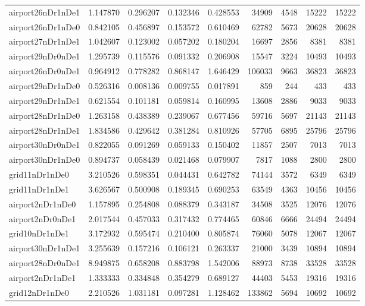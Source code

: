 \begin{longtable}{|l|r|r|r|r|r|r|r|r|}
airport26nDr1nDe1 & 1.147870 & 0.296207 & 0.132346 & 0.428553 & 34909 & 4548 & 15222 & 15222 \\
airport26nDr1nDe0 & 0.842105 & 0.456897 & 0.153572 & 0.610469 & 62782 & 5673 & 20628 & 20628 \\
airport27nDr1nDe1 & 1.042607 & 0.123002 & 0.057202 & 0.180204 & 16697 & 2856 & 8381 & 8381 \\
airport29nDr0nDe1 & 1.295739 & 0.115576 & 0.091332 & 0.206908 & 15547 & 3224 & 10493 & 10493 \\
airport26nDr0nDe1 & 0.964912 & 0.778282 & 0.868147 & 1.646429 & 106033 & 9663 & 36823 & 36823 \\
airport29nDr1nDe0 & 0.526316 & 0.008136 & 0.009755 & 0.017891 & 859 & 244 & 433 & 433 \\
airport29nDr1nDe1 & 0.621554 & 0.101181 & 0.059814 & 0.160995 & 13608 & 2886 & 9033 & 9033 \\
airport28nDr1nDe0 & 1.263158 & 0.438389 & 0.239067 & 0.677456 & 59716 & 5697 & 21143 & 21143 \\
airport28nDr1nDe1 & 1.834586 & 0.429642 & 0.381284 & 0.810926 & 57705 & 6895 & 25796 & 25796 \\
airport30nDr0nDe1 & 0.822055 & 0.091269 & 0.059133 & 0.150402 & 11857 & 2507 & 7013 & 7013 \\
airport30nDr1nDe0 & 0.894737 & 0.058439 & 0.021468 & 0.079907 & 7817 & 1088 & 2800 & 2800 \\
grid11nDr1nDe0 & 3.210526 & 0.598351 & 0.044431 & 0.642782 & 74144 & 3572 & 6349 & 6349 \\
grid11nDr1nDe1 & 3.626567 & 0.500908 & 0.189345 & 0.690253 & 63549 & 4363 & 10456 & 10456 \\
airport2nDr1nDe0 & 1.157895 & 0.254808 & 0.088379 & 0.343187 & 34508 & 3525 & 12076 & 12076 \\
airport2nDr0nDe1 & 2.017544 & 0.457033 & 0.317432 & 0.774465 & 60846 & 6666 & 24494 & 24494 \\
grid10nDr1nDe1 & 3.172932 & 0.595474 & 0.210400 & 0.805874 & 76060 & 5078 & 12067 & 12067 \\
airport30nDr1nDe1 & 3.255639 & 0.157216 & 0.106121 & 0.263337 & 21000 & 3439 & 10894 & 10894 \\
airport28nDr0nDe1 & 8.949875 & 0.658208 & 0.883798 & 1.542006 & 88973 & 8738 & 33528 & 33528 \\
airport2nDr1nDe1 & 1.333333 & 0.334848 & 0.354279 & 0.689127 & 44403 & 5453 & 19316 & 19316 \\
grid12nDr1nDe0 & 2.210526 & 1.031181 & 0.097281 & 1.128462 & 133862 & 5694 & 10692 & 10692 \\

\end{longtable}
